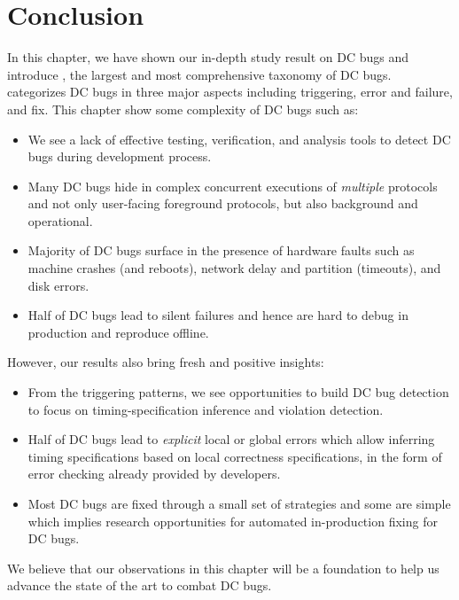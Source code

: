 
\section{Conclusion}

In this chapter, we have shown our in-depth study result on DC bugs and
introduce \taxdc, the largest and most comprehensive taxonomy of DC bugs. 
\taxdc categorizes DC bugs in three major aspects including triggering, error
and failure, and fix. This chapter show some complexity of DC bugs such as:

\begin{itemize}
\item We see a lack of effective testing, verification, and analysis tools to
detect DC bugs during development process.

\item Many DC bugs hide in complex concurrent executions of {\em multiple}
protocols and not only user-facing foreground protocols, but also background and
operational.

\item Majority of DC bugs surface in the presence of hardware faults such as
machine crashes (and reboots), network delay and partition (timeouts), and disk
errors.  

\item Half of DC bugs lead to silent failures and hence are hard to debug in
production and reproduce offline.

\end{itemize}


However, our results also bring fresh and positive insights:

\begin{itemize}
\item From the triggering patterns, we see opportunities to build DC bug
detection to focus on timing-specification inference and violation detection.

\item Half of DC bugs lead to {\em explicit} local or global errors which allow
inferring timing specifications based on local correctness specifications, in
the form of error checking already provided by developers.

\item Most DC bugs are fixed through a small set of strategies and some are
simple which implies research opportunities for automated in-production fixing
for DC bugs.


\end{itemize}

We believe that our observations in this chapter will be a foundation to help us
advance the state of the art to combat DC bugs.
